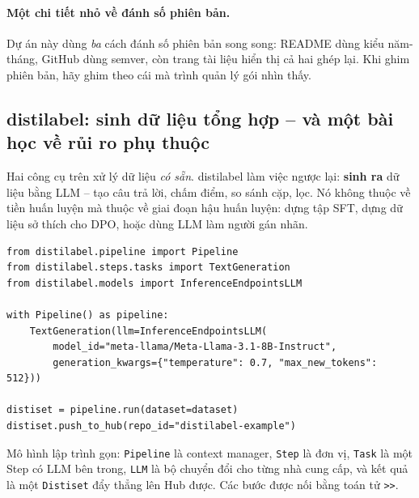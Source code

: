 \paragraph{Một chi tiết nhỏ về đánh số phiên bản.} Dự án này dùng \emph{ba} cách đánh số phiên bản song song: README dùng kiểu năm-tháng, GitHub dùng semver, còn trang tài liệu hiển thị cả hai ghép lại. Khi ghim phiên bản, hãy ghim theo cái mà trình quản lý gói nhìn thấy.

\subsection{distilabel: sinh dữ liệu tổng hợp -- và một bài học về rủi ro phụ thuộc}
\label{ssec:distilabel}

Hai công cụ trên xử lý dữ liệu \emph{có sẵn}. distilabel làm việc ngược lại: \textbf{sinh ra} dữ liệu bằng LLM -- tạo câu trả lời, chấm điểm, so sánh cặp, lọc. Nó không thuộc về tiền huấn luyện mà thuộc về giai đoạn hậu huấn luyện: dựng tập SFT, dựng dữ liệu sở thích cho DPO, hoặc dùng LLM làm người gán nhãn.

\begin{verbatim}
from distilabel.pipeline import Pipeline
from distilabel.steps.tasks import TextGeneration
from distilabel.models import InferenceEndpointsLLM

with Pipeline() as pipeline:
    TextGeneration(llm=InferenceEndpointsLLM(
        model_id="meta-llama/Meta-Llama-3.1-8B-Instruct",
        generation_kwargs={"temperature": 0.7, "max_new_tokens": 512}))

distiset = pipeline.run(dataset=dataset)
distiset.push_to_hub(repo_id="distilabel-example")
\end{verbatim}

\noindent Mô hình lập trình gọn: \texttt{Pipeline} là context manager, \texttt{Step} là đơn vị, \texttt{Task} là một Step có LLM bên trong, \texttt{LLM} là bộ chuyển đổi cho từng nhà cung cấp, và kết quả là một \texttt{Distiset} đẩy thẳng lên Hub được. Các bước được nối bằng toán tử \texttt{>>}.

